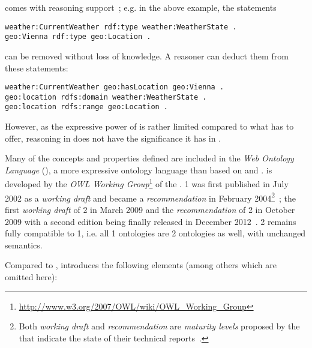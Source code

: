  comes with reasoning support~\cite{RDF_semantics}; e.g. in the above example, the statements

\begin{verbatim}
weather:CurrentWeather rdf:type weather:WeatherState .
geo:Vienna rdf:type geo:Location .
\end{verbatim}

can be removed without loss of knowledge. A reasoner can deduct them from these statements:

\begin{verbatim}
weather:CurrentWeather geo:hasLocation geo:Vienna .
geo:location rdfs:domain weather:WeatherState .
geo:location rdfs:range geo:Location .
\end{verbatim}
However, as the expressive power of  is rather limited compared to what  has to offer, reasoning in  does not have the significance it has in .

Many of the concepts and properties defined are included in the \emph{Web Ontology Language} (), a more expressive ontology language than  based on  and .  is developed by the \emph{OWL Working Group}\footnote{\href{http://www.w3.org/2007/OWL/wiki/OWL\_Working\_Group}{http://www.w3.org/2007/OWL/wiki/OWL\_Working\_Group}} of the .  1 was first published in July 2002 as a \emph{working draft} and became a  \emph{recommendation} in February 2004\footnote{Both \emph{working draft} and \emph{recommendation} are \emph{maturity levels} proposed by the  that indicate the state of their technical reports~\cite{w3c-process}.}~\cite{OWL1}; the first \emph{working draft} of  2 in March 2009 and the  \emph{recommendation} of  2 in October 2009 with a second edition being finally released in December 2012~\cite{OWL}.
 2 remains fully compatible to  1, i.e. all  1 ontologies are  2 ontologies as well, with unchanged semantics.

Compared to ,  introduces the following elements (among others which are omitted here):


